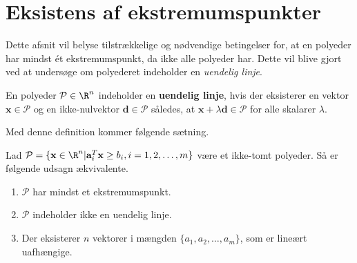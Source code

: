 \section{Eksistens af ekstremumspunkter}
%
Dette afsnit vil belyse tilstrækkelige og nødvendige betingelser for, at en polyeder har mindst ét ekstremumspunkt, da ikke alle polyeder har.
Dette vil blive gjort ved at undersøge om polyederet indeholder en \textit{uendelig linje}.
%
\begin{defn}{}{}
En polyeder $\mathcal{P} \in \R^n$  indeholder en \textbf{uendelig linje}, hvis der eksisterer en vektor $\textbf{x} \in \mathcal{P}$ og en ikke-nulvektor $\textbf{d} \in \mathcal{P}$ således, at $\textbf{x} + \lambda \textbf{d} \in \mathcal{P}$ for alle skalarer $\lambda$.
\end{defn}
\noindent
%
Med denne definition kommer følgende sætning.
%
\begin{thm}{}{}
Lad $\mathcal{P} = \{\textbf{x} \in \R^n | \textbf{a}_i^T\textbf{x} \geq b_i, i = 1,2,\ldots,m  \}$ være et ikke-tomt polyeder.
Så er følgende udsagn ækvivalente.
%
\begin{enumerate}[label = (\alph*)]
\item $\mathcal{P}$ har mindst et ekstremumspunkt.
\item $\mathcal{P}$ indeholder ikke en uendelig linje.
\item Der eksisterer $n$ vektorer i mængden $\{a_1, a_2, \ldots ,a_m \}$, som er lineært uafhængige.
\end{enumerate}
\end{thm}
%
